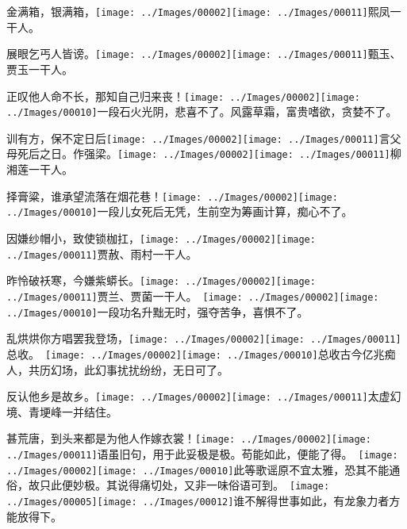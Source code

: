 金满箱，银满箱，{\texttt{[image: ../Images/00002]}\texttt{[image: ../Images/00011]}\footnotesize \kaishu 熙凤一干人。}

展眼乞丐人皆谤。{\texttt{[image: ../Images/00002]}\texttt{[image: ../Images/00011]}\footnotesize \kaishu 甄玉、贾玉一干人。}

正叹他人命不长，那知自己归来丧！{\texttt{[image: ../Images/00002]}\texttt{[image: ../Images/00010]}\footnotesize \kaishu 一段石火光阴，悲喜不了。风露草霜，富贵嗜欲，贪婪不了。}

训有方，保不定日后{\texttt{[image: ../Images/00002]}\texttt{[image: ../Images/00011]}\footnotesize \kaishu 言父母死后之日。}作强梁。{\texttt{[image: ../Images/00002]}\texttt{[image: ../Images/00011]}\footnotesize \kaishu 柳湘莲一干人。}

择膏粱，谁承望流落在烟花巷！{\texttt{[image: ../Images/00002]}\texttt{[image: ../Images/00010]}\footnotesize \kaishu 一段儿女死后无凭，生前空为筹画计算，痴心不了。}

因嫌纱帽小，致使锁枷扛，{\texttt{[image: ../Images/00002]}\texttt{[image: ../Images/00011]}\footnotesize \kaishu 贾赦、雨村一干人。}

昨怜破袄寒，今嫌紫蟒长。{\texttt{[image: ../Images/00002]}\texttt{[image: ../Images/00011]}\footnotesize \kaishu 贾兰、贾菌一干人。　\texttt{[image: ../Images/00002]}\texttt{[image: ../Images/00010]}\footnotesize \kaishu 一段功名升黜无时，强夺苦争，喜惧不了。}

乱烘烘你方唱罢我登场，{\texttt{[image: ../Images/00002]}\texttt{[image: ../Images/00011]}\footnotesize \kaishu 总收。　\texttt{[image: ../Images/00002]}\texttt{[image: ../Images/00010]}\footnotesize \kaishu 总收古今亿兆痴人，共历幻场，此幻事扰扰纷纷，无日可了。}

反认他乡是故乡。{\texttt{[image: ../Images/00002]}\texttt{[image: ../Images/00011]}\footnotesize \kaishu 太虚幻境、青埂峰一并结住。}

甚荒唐，到头来都是为他人作嫁衣裳！{{\texttt{[image: ../Images/00002]}\texttt{[image: ../Images/00011]}\footnotesize \kaishu 语虽旧句，用于此妥极是极。苟能如此，便能了得。　\texttt{[image: ../Images/00002]}\texttt{[image: ../Images/00010]}\footnotesize \kaishu 此等歌谣原不宜太雅，恐其不能通俗，故只此便妙极。其说得痛切处，又非一味俗语可到。　}\texttt{[image: ../Images/00005]}\texttt{[image: ../Images/00012]}\footnotesize \kaishu 谁不解得世事如此，有龙象力者方能放得下。}

